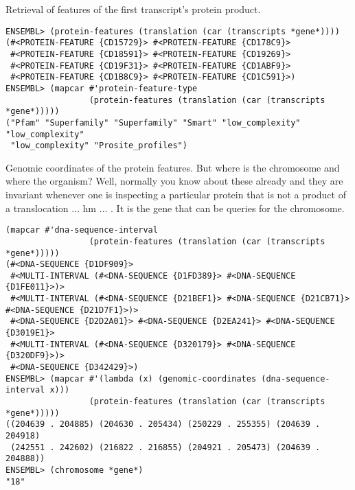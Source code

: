 \documentclass{book}
\begin{document}
Retrieval of features of the first transcript's protein product.

\begin{lstlisting}
ENSEMBL> (protein-features (translation (car (transcripts *gene*))))
(#<PROTEIN-FEATURE {CD15729}> #<PROTEIN-FEATURE {CD178C9}>
 #<PROTEIN-FEATURE {CD18591}> #<PROTEIN-FEATURE {CD19269}>
 #<PROTEIN-FEATURE {CD19F31}> #<PROTEIN-FEATURE {CD1ABF9}>
 #<PROTEIN-FEATURE {CD1B8C9}> #<PROTEIN-FEATURE {CD1C591}>)
ENSEMBL> (mapcar #'protein-feature-type
                 (protein-features (translation (car (transcripts *gene*)))))
("Pfam" "Superfamily" "Superfamily" "Smart" "low_complexity" "low_complexity"
 "low_complexity" "Prosite_profiles")
\end{lstlisting}

Genomic coordinates of the protein features. But where is the chromosome
and where the organism? Well, normally you know about these already and they
are invariant whenever one is inspecting a particular protein that is not
a product of a translocation $\ldots$ hm $\ldots$ . It is the gene that can
be queries for the chromosome.

\begin{lstlisting}
(mapcar #'dna-sequence-interval
                 (protein-features (translation (car (transcripts *gene*)))))
(#<DNA-SEQUENCE {D1DF909}>
 #<MULTI-INTERVAL (#<DNA-SEQUENCE {D1FD389}> #<DNA-SEQUENCE {D1FE011}>)>
 #<MULTI-INTERVAL (#<DNA-SEQUENCE {D21BEF1}> #<DNA-SEQUENCE {D21CB71}> #<DNA-SEQUENCE {D21D7F1}>)>
 #<DNA-SEQUENCE {D2D2A01}> #<DNA-SEQUENCE {D2EA241}> #<DNA-SEQUENCE {D3019E1}>
 #<MULTI-INTERVAL (#<DNA-SEQUENCE {D320179}> #<DNA-SEQUENCE {D320DF9}>)>
 #<DNA-SEQUENCE {D342429}>)
ENSEMBL> (mapcar #'(lambda (x) (genomic-coordinates (dna-sequence-interval x)))
                 (protein-features (translation (car (transcripts *gene*)))))
((204639 . 204885) (204630 . 205434) (250229 . 255355) (204639 . 204918)
 (242551 . 242602) (216822 . 216855) (204921 . 205473) (204639 . 204888))
ENSEMBL> (chromosome *gene*)
"18"

\end{lstlisting}
\end{document}

